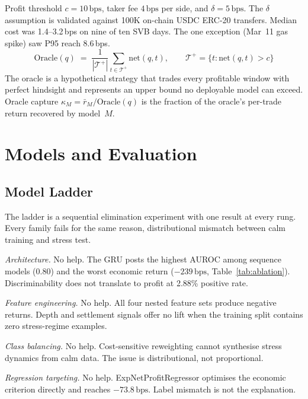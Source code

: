 \documentclass[sigconf,anonymous,natbib=false]{acmart}
\newcommand{\bps}{\,\text{bps}}
\begin{document}
Profit threshold $c{=}10\bps$, taker fee $4\bps$ per side, and
$\delta{=}5\bps$.
The $\delta$ assumption is validated against 100K on-chain USDC
ERC-20 transfers. Median cost was 1.4--3.2\,bps on nine of ten SVB
days. The one exception (Mar~11 gas spike) saw P95 reach 8.6\,bps.
\begin{equation}
  \text{Oracle}(q) \;=\; \frac{1}{|\mathcal{T}^+|}
    \sum_{t \in \mathcal{T}^+} \!\text{net}(q,t),\qquad
  \mathcal{T}^+ = \bigl\{t : \text{net}(q,t) > c\bigr\}
  \label{eq:oracle}
\end{equation}
The oracle is a hypothetical strategy that trades every
profitable window with perfect hindsight and represents an upper bound
no deployable model can exceed.
Oracle capture $\kappa_M = \bar{r}_M / \text{Oracle}(q)$ is the
fraction of the oracle's per-trade return recovered by model~$M$.


\section{Models and Evaluation}
\label{sec:models}

\subsection{Model Ladder}
\label{sec:stack}

The ladder is a sequential elimination experiment with one result at
every rung. Every family fails for the same reason, distributional
mismatch between calm training and stress test.

\textit{Architecture.} No help.
The GRU posts the highest AUROC among sequence models (0.80) and
the worst economic return ($-239\bps$, Table~\ref{tab:ablation}).
Discriminability does not translate to profit at 2.88\% positive rate.

\textit{Feature engineering.} No help.
All four nested feature sets produce negative returns.
Depth and settlement signals offer no lift when the training split
contains zero stress-regime examples.

\textit{Class balancing.} No help.
Cost-sensitive reweighting cannot synthesise stress dynamics from calm
data. The issue is distributional, not proportional.

\textit{Regression targeting.} No help.
ExpNetProfitRegressor optimises the economic criterion directly and
reaches $-73.8\bps$. Label mismatch is not the explanation.
\end{document}
